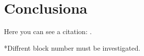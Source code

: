 \chapter{Conclusiona}
Here you can see a citation: \cite{atc13}.

*Diffrent block number must be investigated.

\lipsum[7]
